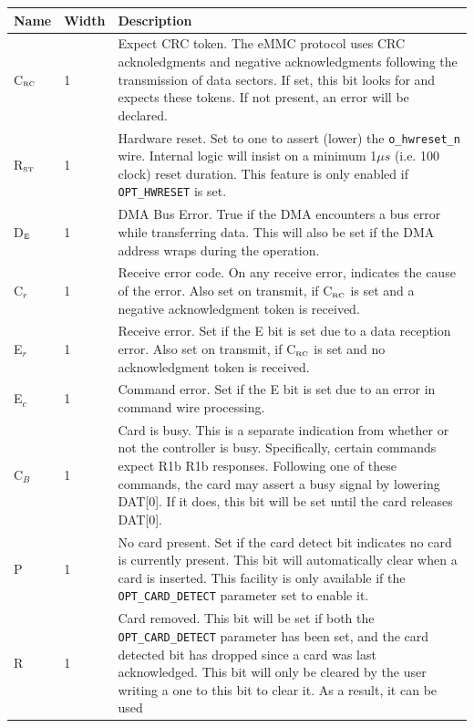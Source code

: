 \documentclass{gqtekspec}
\begin{document}
\begin{table}\begin{center}
\begin{tabular}{|p{1.2in}|p{0.5in}|p{4.0in}|}\hline
	\rowcolor[gray]{0.85} Name & Width & Description\\\hline\hline
C$_{\mbox{\tiny RC}}$&1& Expect CRC token.  The eMMC protocol uses CRC
	acknoledgments and negative acknowledgments following the transmission
	of data sectors.  If set, this bit looks for and expects these tokens.
	If not present, an error will be declared.
	\\
R$_{\mbox{\tiny ST}}$&1& Hardware reset.  Set to one to assert (lower) the
	{\tt o\_hwreset\_n} wire.  Internal logic will insist on a minimum
	1$\mu s$ (i.e. 100 clock) reset duration.  This feature is only
	enabled if {\tt OPT\_HWRESET} is set.\\
D$_{\mbox{\tiny E}}$&1& DMA Bus Error.  True if the DMA encounters a bus error
	while transferring data.  This will also be set if the DMA address
	wraps during the operation. \\
C$_r$&1& Receive error code.  On any receive error, indicates the cause of
	the error.  Also set on transmit, if C$_{\mbox{\tiny RC}}$ is set and
	a negative acknowledgment token is received.\\
E$_r$&1& Receive error.  Set if the E bit is set due to a data reception error.
	Also set on transmit, if C$_{\mbox{\tiny RC}}$ is set and no
	acknowledgment token is received.
	\\
E$_c$&1& Command error.  Set if the E bit is set due to an error in command
	wire processing.  \\
C$_B$&1& Card is busy.  This is a separate indication from whether or not the
	controller is busy.  Specifically, certain commands expect R1b
	R1b responses.  Following one of these commands, the card may assert a
	busy signal by lowering DAT[0].  If it does, this bit will be set
	until the card releases DAT[0].\\
P & 1 & No card present.  Set if the card detect bit indicates no card is
	currently present.  This bit will automatically clear when a card
	is inserted.  This facility is only available if the
	{\tt OPT\_CARD\_DETECT} parameter set to enable it.\\
R & 1 & Card removed.  This bit will be set if both the {\tt OPT\_CARD\_DETECT}
	parameter has been set, and the card detected bit has dropped since
	a card was last acknowledged.  This bit will only be cleared by the user
	writing a one to this bit to clear it.   As a result, it can be used

\end{tabular}
\end{center}
\end{table}
\end{document}
